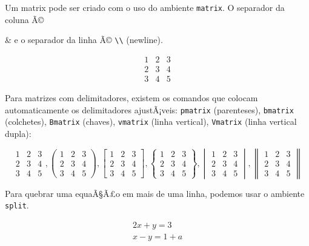 \documentclass[12pt,a4paper]{article}
\begin{document}

Um matrix pode ser criado com o uso do ambiente \verb+matrix+. 
O separador da coluna Ã©

\& e o separador da linha Ã© \verb|\\| (newline).

\[
  \begin{matrix}
   1 & 2 & 3 \\
   2 & 3 & 4 \\
   3 & 4 & 5  
  \end{matrix}
\]

Para matrizes com delimitadores, existem os comandos que colocam automaticamente
os delimitadores ajustÃ¡veis: 
\verb+pmatrix+ (parenteses), \verb+bmatrix+ (colchetes), 
\verb+Bmatrix+ (chaves), \verb+vmatrix+ (linha vertical), \verb+Vmatrix+ (linha vertical dupla):

\[
  \begin{matrix}
   1 & 2 & 3 \\
   2 & 3 & 4 \\
   3 & 4 & 5  
  \end{matrix},
  \begin{pmatrix}
   1 & 2 & 3 \\
   2 & 3 & 4 \\
   3 & 4 & 5  
  \end{pmatrix}, 
  \begin{bmatrix}
   1 & 2 & 3 \\
   2 & 3 & 4 \\
   3 & 4 & 5  
  \end{bmatrix}, 
  \begin{Bmatrix}
   1 & 2 & 3 \\
   2 & 3 & 4 \\
   3 & 4 & 5  
  \end{Bmatrix}, 
  \begin{vmatrix}
   1 & 2 & 3 \\
   2 & 3 & 4 \\
   3 & 4 & 5  
  \end{vmatrix},
  \begin{Vmatrix}
   1 & 2 & 3 \\
   2 & 3 & 4 \\
   3 & 4 & 5  
  \end{Vmatrix}
\]

Para quebrar uma equaÃ§Ã£o em mais de uma linha, podemos usar o ambiente \verb+split+.

\[
\begin{split}
2x+y=3 \\
x-y=1+a
\end{split}
\]
\end{document}

